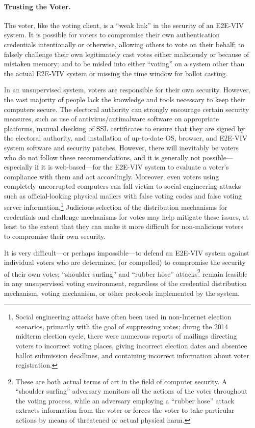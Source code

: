 \paragraph{Trusting the Voter.} The voter, like the voting client, is
a ``weak link'' in the security of an E2E-VIV system. It is possible
for voters to compromise their own authentication credentials
intentionally or otherwise, allowing others to vote on their behalf;
to falsely challenge their own legitimately cast votes either
maliciously or because of mistaken memory; and to be misled into
either ``voting'' on a system other than the actual E2E-VIV system or
missing the time window for ballot casting.

In an unsupervised system, voters are responsible for their own
security. However, the vast majority of people lack the knowledge and
tools necessary to keep their computers secure. The electoral
authority can strongly encourage certain security measures, such as
use of antivirus/antimalware software on appropriate platforms, manual
checking of SSL certificates to ensure that they are signed by the
electoral authority, and installation of up-to-date OS, browser, and
E2E-VIV system software and security patches. However, there will
inevitably be voters who do not follow these recommendations, and it
is generally not possible---especially if it is web-based---for the
E2E-VIV system to evaluate a voter's compliance with them and act
accordingly.  Moreover, even voters using completely uncorrupted
computers can fall victim to social engineering attacks such as
official-looking physical mailers with false voting codes and false
voting server information.\footnote{Social engineering attacks have
  often been used in non-Internet election scenarios, primarily with
  the goal of suppressing votes; durng the 2014 midterm election
  cycle, there were numerous reports of mailings directing voters to
  incorrect voting places, giving incorrect election dates and
  absentee ballot submission deadlines, and containing incorrect
  information about voter registration.}  Judicious selection of the
distribution mechanisms for credentials and challenge mechanisms for
votes may help mitigate these issues, at least to the extent that they
can make it more difficult for non-malicious voters to compromise
their own security.

It is very difficult---or perhaps impossible---to defend an E2E-VIV
system against individual voters who are determined (or compelled) to
compromise the security of their own votes; ``shoulder surfing'' and
``rubber hose'' attacks\footnote{These are both actual terms of art in
  the field of computer security. A ``shoulder surfing'' adversary
  monitors all the actions of the voter throughout the voting process,
  while an adversary employing a ``rubber hose'' attack extracts
  information from the voter or forces the voter to take particular
  actions by means of threatened or actual physical harm.} remain
feasible in any unsupervised voting environment, regardless of the
credential distribution mechanism, voting mechanism, or other
protocols implemented by the system.

